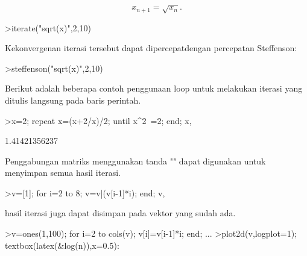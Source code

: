 \documentclass[a4paper,10pt]{article}
\begin{document}
\begin{eulernotebook}
\begin{eulercomment}
\begin{eulercomment}
\begin{eulercomment}
\begin{eulercomment}
\begin{eulercomment}
\begin{eulercomment}
\begin{eulercomment}
\end{eulercomment}
\begin{eulerformula}
\[
x_{n+1} = \sqrt{x_n}.
\]
\end{eulerformula}
\begin{eulerprompt}
>iterate("sqrt(x)",2,10)
\end{eulerprompt}
\begin{euleroutput}
  [2,  1.41421,  1.18921,  1.09051,  1.04427,  1.0219,  1.01089,
  1.00543,  1.00271,  1.00135,  1.00068]
\end{euleroutput}
\begin{eulercomment}
Kekonvergenan iterasi tersebut dapat dipercepatdengan percepatan Steffenson:
\end{eulercomment}
\begin{eulerprompt}
>steffenson("sqrt(x)",2,10)
\end{eulerprompt}
\begin{euleroutput}
  [1.04888,  1.00028,  1,  1]
\end{euleroutput}
\begin{eulercomment}
Berikut adalah beberapa contoh penggunaan loop untuk melakukan iterasi yang ditulis langsung
pada baris perintah.
\end{eulercomment}
\begin{eulerprompt}
>x=2; repeat x=(x+2/x)/2; until x^2~=2; end; x,
\end{eulerprompt}
\begin{euleroutput}
  1.41421356237
\end{euleroutput}
\begin{eulercomment}
Penggabungan matriks menggunakan tanda "\textbar{}" dapat digunakan untuk menyimpan semua hasil
iterasi.
\end{eulercomment}
\begin{eulerprompt}
>v=[1]; for i=2 to 8; v=v|(v[i-1]*i); end; v,
\end{eulerprompt}
\begin{euleroutput}
  [1,  2,  6,  24,  120,  720,  5040,  40320]
\end{euleroutput}
\begin{eulercomment}
hasil iterasi juga dapat disimpan pada vektor yang sudah ada.
\end{eulercomment}
\begin{eulerprompt}
>v=ones(1,100); for i=2 to cols(v); v[i]=v[i-1]*i; end; ...
>plot2d(v,logplot=1); textbox(latex(&log(n)),x=0.5):
\end{eulerprompt}

\end{eulercomment}
\end{eulercomment}
\end{eulercomment}
\end{eulercomment}
\end{eulercomment}
\end{eulercomment}
\end{eulernotebook}
\end{document}
